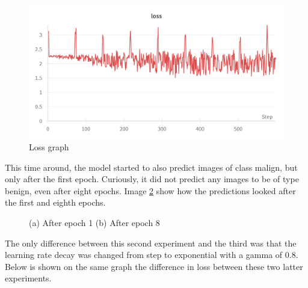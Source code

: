 \begin{figure}[!ht]
    \centering
    \includegraphics[width=1\textwidth]{figures/Figure11.png}
    \caption{Loss graph}
    \label{fig:fig10}
\end{figure}
This time around, the model started to also predict images of class malign, but only after the first epoch. Curiously, it did not predict any images to be of type benign, even after eight epochs. Image \ref{fig:fig11} show how the predictions looked after the first and eighth epochs.\\
\begin{figure}[!ht]
    \label{fig:fig11}
    \caption{(a) After epoch 1 (b) After epoch 8}
\end{figure}
The only difference between this second experiment and the third was that the learning rate decay was changed from step to exponential with a gamma of 0.8. Below is shown on the same graph the difference in loss between these two latter experiments.\\
